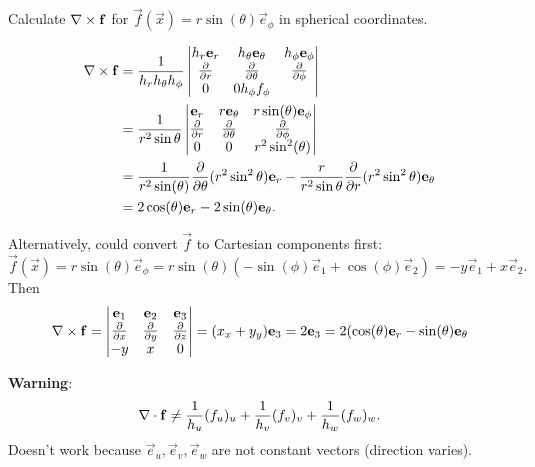 \documentclass[10pt, a4paper]{article}
\begin{document}
\begin{example}
    Calculate $\mathbf{\nabla} \times \mathbf{f}$ for $\vec{f}(\vec{x}) = r\sin(\theta)\vec{e}_{\phi}$ in spherical coordinates.

    \begin{solution}
        \begin{align*}
            \mathbf{\nabla} \times \mathbf{f} &= \frac{1}{h_rh_{\theta}h_{\phi}}\begin{vmatrix}
                h_r\mathbf{e}_r & h_{\theta}\mathbf{e}_{\theta} & h_{\phi}\mathbf{e}_{\phi} \\
                \frac{\partial }{\partial r} & \frac{\partial }{\partial \theta} & \frac{\partial }{\partial \phi} \\
                0 & 0 h_{\phi}f_{\phi}
            \end{vmatrix} \\
            &= \frac{1}{r ^ 2\sin{\theta}}\begin{vmatrix}
                \mathbf{e}_r & r\mathbf{e}_{\theta} & r\sin(\theta)\mathbf{e}_{\phi} \\
                \frac{\partial }{\partial r} & \frac{\partial }{\partial \theta} & \frac{\partial }{\partial \phi} \\
                0 & 0 & r ^ 2\sin ^ 2(\theta)
            \end{vmatrix} \\
            &= \frac{1}{r ^ 2\sin(\theta)}\frac{\partial }{\partial \theta}(r ^ 2\sin ^ 2\theta)\mathbf{e}_r - \frac{r}{r ^ 2\sin{\theta}}\frac{\partial }{\partial r}(r ^ 2\sin ^ 2\theta)\mathbf{e}_{\theta} \\
            &= 2\cos(\theta)\mathbf{e}_r - 2\sin(\theta)\mathbf{e}_{\theta}.
        \end{align*}

        Alternatively,
        could convert $\vec{f}$ to Cartesian components first:
        \[
        \vec{f}(\vec{x}) = r\sin(\theta)\vec{e}_{\phi} = r\sin(\theta)(-\sin(\phi)\vec{e}_1 + \cos(\phi)\vec{e}_2) = -y\vec{e}_1 + x\vec{e}_2.
        \]
        Then
        \[
        \mathbf{\nabla} \times \mathbf{f} = \begin{vmatrix}
            \mathbf{e}_1 & \mathbf{e}_2 & \mathbf{e}_3 \\
            \frac{\partial }{\partial x} & \frac{\partial }{\partial y} & \frac{\partial }{\partial z} \\
            -y  & x & 0
        \end{vmatrix} = (x_x + y_y)\mathbf{e}_3 = 2\mathbf{e}_3 = 2(\cos(\theta)\mathbf{e}_r - \sin(\theta)\mathbf{e}_{\theta}
        \]
    \end{solution}
\end{example}

\textbf{Warning}:
\[
\mathbf{\nabla} \cdot \mathbf{f} \neq \frac{1}{h_u}(f_u)_u + \frac{1}{h_v}(f_v)_v + \frac{1}{h_w}(f_w)_w.
\]
Doesn't work because $\vec{e}_u, \vec{e}_v, \vec{e}_w$ are not constant vectors
(direction varies).
\end{document}
